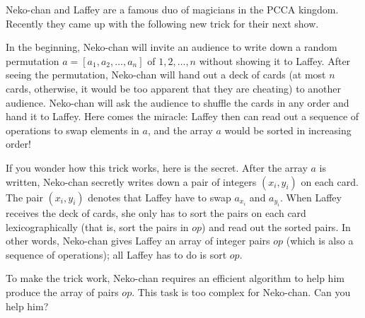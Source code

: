 Neko-chan and Laffey are a famous duo of magicians in the PCCA kingdom.
Recently they came up with the following new trick for their next show.

In the beginning, Neko-chan will invite an audience to write down a random permutation $a=[a_1,a_2,\ldots,a_n]$ of $1,2,\ldots,n$ without showing it to Laffey.
After seeing the permutation, Neko-chan will hand out a deck of cards (at most $n$ cards, otherwise, it would be too apparent that they are cheating) to another audience.
Neko-chan will ask the audience to shuffle the cards in any order and hand it to Laffey.
Here comes the miracle: Laffey then can read out a sequence of operations to swap elements in $a$, and the array $a$ would be sorted in increasing order!

If you wonder how this trick works, here is the secret.
After the array $a$ is written, Neko-chan secretly writes down a pair of integers $(x_i,y_i)$ on each card.
The pair $(x_i,y_i)$ denotes that Laffey have to swap $a_{x_i}$ and $a_{y_i}$.
When Laffey receives the deck of cards, she only has to sort the pairs on each card lexicographically  (that is, sort the pairs in $op$) and read out the sorted pairs.
In other words, Neko-chan gives Laffey an array of integer pairs $op$ (which is also a sequence of operations); all Laffey has to do is sort $op$.

To make the trick work, Neko-chan requires an efficient algorithm to help him produce the array of pairs $op$.
This task is too complex for Neko-chan. Can you help him?